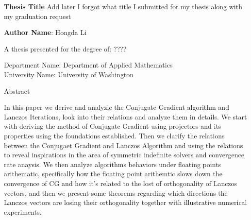 \documentclass[]{article}
\theoremstyle{definition}
\begin{document}
\begin{center}
    \vspace*{1cm}
    \textbf{Thesis Title}
        Add later I forgot what title I submitted for my thesis along with my graduation request
    \vspace{1.5cm}

    \textbf{Author Name}: Hongda Li

    \vfill
         
    A thesis presented for the degree of: ???? 
         
    \vspace{0.8cm}
         
    Department Name: Department of Applied Mathematics\\

    University Name: University of Washington\\

    

\end{center}

    \begin{center}
        Abstract
    \end{center}

    In this paper we derive and analyzie the Conjugate Gradient algorithm and Lanczos Iterations, look into their relations and analyze them in details. We start with deriving the method of Conjugate Gradient using projectors and its properties using the foundations established. Then we clarify the relations between the Conjugaet Gradient and Lanczos Algorithm and using the relations to reveal inspirations in the area of symmetric indefinite solvers and convergence rate anaysis. We then analyze algorithms behaviors under floating points arithematic, specifically how the floating point arithemtic slows down the convergence of CG and how it's related to the lost of orthogonality of Lanczos vectors, and then we present some theorems regarding which directions the Lanczos vectors are losing their orthogonality together with illustrative numerical experiments.
    
         

\newpage
\tableofcontents

\newpage 
\end{document}

